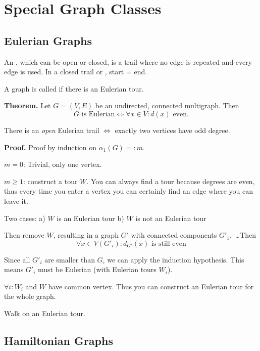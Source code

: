 \section{Special Graph Classes}

\subsection{Eulerian Graphs}

\begin{definition}
An , which can be open or closed, is a trail where no edge is repeated and every edge is used. In a closed trail or , start = end.
\end{definition}

\begin{definition}
A graph is called  if there is an Eulerian tour.
\end{definition}

\textbf{Theorem.}
Let $G=(V,E)$ be an undirected, connected multigraph. Then
\[
  G\text{ is Eulerian} \iff \forall x\in V: d(x)\text{ even}.
\]

There is an \emph{open} Eulerian trail $\iff$ exactly two vertices have odd degree.

\textbf{Proof.}
Proof by induction on $\alpha_1(G) =: m$.

$m = 0$: Trivial, only one vertex.

$m ≥ 1$: construct a tour $W$. You can always find a tour because degrees are even, thus every time you enter a vertex you can certainly find an edge where you can leave it.

Two cases:
a) $W$ is an Eulerian tour
b) $W$ is not an Eulerian tour

Then remove $W$, resulting in a graph $G'$ with connected components $G'_1$,~\ldots Then
\[
    \forall x\in V(G'_{i}): d_{G'}(x)\text{ is still even}
\]

Since all $G'_{i}$ are smaller than $G$, we can apply the induction hypothesis. This means $G'_{i}$ must be Eulerian (with Eulerian tours $W_{i}$).

$\forall i: W_i$ and $W$ have common vertex. Thus you can construct an Eulerian tour for the whole graph.



Walk on an Eulerian tour.

\subsection{Hamiltonian Graphs}


